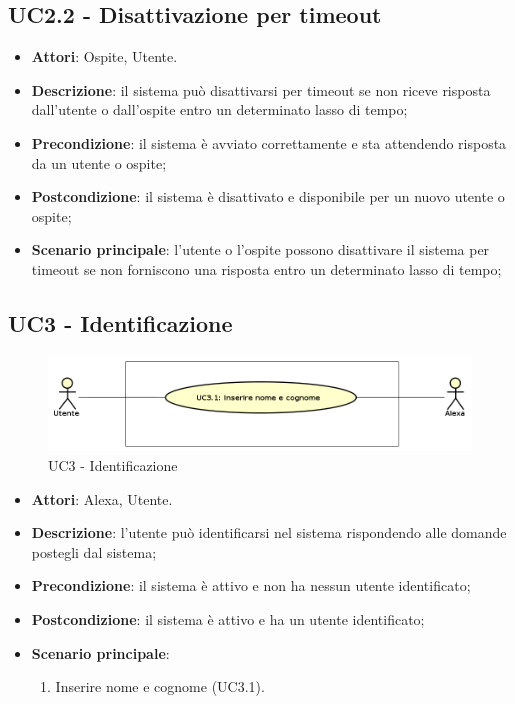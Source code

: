 \documentclass[../AnalisiDeiRequisiti_v3.0.0.tex]{subfiles}
\begin{document}
\subsection{UC2.2 - Disattivazione per timeout} 
\label{sssec:UC2.2} 
\begin{itemize} 
\item \textbf{Attori}: Ospite, Utente.
\item \textbf{Descrizione}: il sistema può disattivarsi per timeout se non riceve risposta dall'utente o dall'ospite entro un determinato lasso di tempo;
\item \textbf{Precondizione}: il sistema è avviato correttamente e sta attendendo risposta da un utente o ospite;
\item \textbf{Postcondizione}: il sistema è disattivato e disponibile per un nuovo utente o ospite;
\item \textbf{Scenario principale}: l'utente o l'ospite possono disattivare il sistema per timeout se non forniscono una risposta entro un determinato lasso di tempo;
\end{itemize} 
\subsection{UC3 - Identificazione} 
\label{sssec:UC3} 
\begin{figure}[!h]
	\centering
	\includegraphics[width=\textwidth]{UseCases/UC3_Identificazione/UC3_Identificazione.png}
	\caption{UC3 - Identificazione}
\end{figure}
\begin{itemize} 
\item \textbf{Attori}: Alexa, Utente.
\item \textbf{Descrizione}: l'utente può identificarsi nel sistema rispondendo alle domande postegli dal sistema;
\item \textbf{Precondizione}: il sistema è attivo e non ha nessun utente identificato;
\item \textbf{Postcondizione}: il sistema è attivo e ha un utente identificato;
\item \textbf{Scenario principale}: \begin{enumerate}\item Inserire nome e cognome (UC3.1). 
 \end{enumerate}
\end{itemize} 
\end{document}
